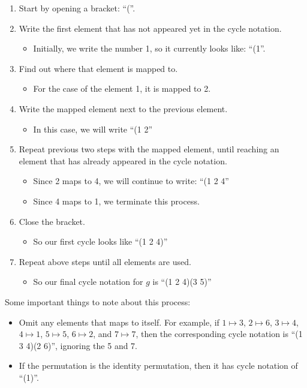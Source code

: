 \begin{enumerate}
    \item Start by opening a bracket: ``(''.
    \item Write the first element that has not appeared yet in the cycle notation.
    \begin{itemize}
        \item Initially, we write the number 1, so it currently looks like: ``(1''.
    \end{itemize}
    \item Find out where that element is mapped to.
    \begin{itemize}
        \item For the case of the element 1, it is mapped to 2.
    \end{itemize}
    \item Write the mapped element next to the previous element.
    \begin{itemize}
        \item In this case, we will write ``(1 2''
    \end{itemize}
    \item Repeat previous two steps with the mapped element, until reaching an element that has already appeared in the cycle notation.
    \begin{itemize}
        \item Since 2 maps to 4, we will continue to write: ``(1 2 4''
        \item Since 4 maps to 1, we terminate this process.
    \end{itemize}
    \item Close the bracket.
    \begin{itemize}
        \item So our first cycle looks like ``(1 2 4)''
    \end{itemize}
    \item Repeat above steps until all elements are used.
    \begin{itemize}
        \item So our final cycle notation for $g$ is ``(1 2 4)(3 5)''
    \end{itemize}
\end{enumerate}
Some important things to note about this process:
\begin{itemize}
    \item Omit any elements that maps to itself. For example, if $1 \mapsto 3$, $2 \mapsto 6$, $3 \mapsto 4$, $4 \mapsto 1$, $5 \mapsto 5$, $6 \mapsto 2$, and $7 \mapsto 7$, then the corresponding cycle notation is ``(1 3 4)(2 6)'', ignoring the 5 and 7.
    \item If the permutation is the identity permutation, then it has cycle notation of ``(1)''.
\end{itemize}

